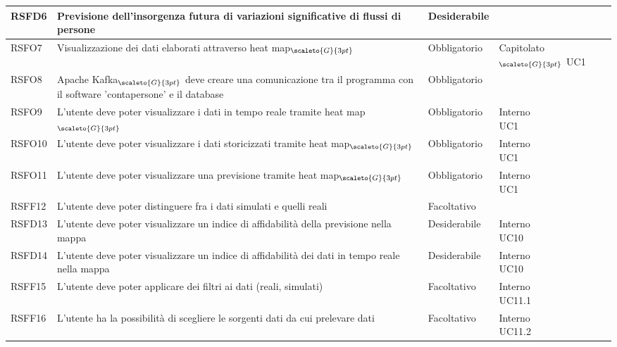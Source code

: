 {\begin{center}
\begin{longtable}{|p{3cm}|p{4cm}|p{4cm}|p{4cm}|}
			\hline
			\centering RSFD6 & Previsione dell'insorgenza futura di variazioni significative di flussi di persone & \centering Desiderabile & \makecell[tc]{Capitolato$_{\scaleto{G}{3pt}}$ }  \\
			\hline
			\centering RSFO7 & Visualizzazione dei dati elaborati attraverso heat map$_{\scaleto{G}{3pt}}$ &\centering  Obbligatorio & \makecell[tc]{Capitolato$_{\scaleto{G}{3pt}}$ \\ UC1}  \\
			\hline
			\centering RSFO8 & Apache Kafka$_{\scaleto{G}{3pt}}$ deve creare una comunicazione tra il programma con il software 'contapersone' e il database  &\centering  Obbligatorio &  \makecell[tc]{Interno} 	\\
			\hline
			\centering RSFO9 & L'utente deve poter visualizzare i dati in tempo reale tramite heat map$_{\scaleto{G}{3pt}}$  &\centering  Obbligatorio &  \makecell[tc]{Interno \\ UC1} 	\\
			\hline
			\centering RSFO10 & L'utente deve poter visualizzare i dati storicizzati tramite heat map$_{\scaleto{G}{3pt}}$  &\centering  Obbligatorio &  \makecell[tc]{Interno \\ UC1} 	\\
			\hline
			\centering RSFO11 & L'utente deve poter visualizzare una previsione tramite heat map$_{\scaleto{G}{3pt}}$  &\centering  Obbligatorio &  \makecell[tc]{Interno \\ UC1} 	\\
			\hline
			\centering RSFF12 & L'utente deve poter distinguere fra i dati simulati e quelli reali  &\centering  Facoltativo &  \makecell[tc]{Interno} 	\\
			\hline
			\centering RSFD13 & L'utente deve poter visualizzare un indice di affidabilità della previsione nella mappa  &\centering  Desiderabile &  \makecell[tc]{Interno \\ UC10} 	\\
			\hline
			\centering RSFD14 & L'utente deve poter visualizzare un indice di affidabilità dei dati in tempo reale nella mappa  &\centering  Desiderabile &  \makecell[tc]{Interno \\ UC10} 	\\
			\hline
			\centering RSFF15 & L'utente deve poter applicare dei filtri ai dati (reali, simulati)  &\centering  Facoltativo &  \makecell[tc]{Interno \\ UC11.1 } 	\\
			\hline
			\centering RSFF16 & L'utente ha la possibilità di scegliere le sorgenti dati da cui prelevare dati  &\centering  Facoltativo &  \makecell[tc]{Interno \\ UC11.2} 	\\

\end{longtable}
\end{center}}

